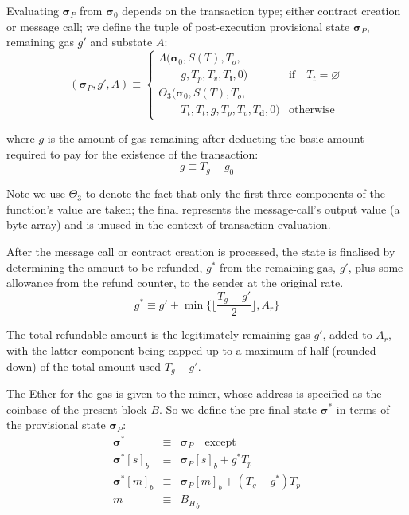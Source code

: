 \documentclass[9pt,oneside]{amsart}
\begin{document}
\begin{multicols}{2}
Evaluating $\boldsymbol{\sigma}_P$ from $\boldsymbol{\sigma}_0$ depends on the transaction type; either contract creation or message call; we define the tuple of post-execution provisional state $\boldsymbol{\sigma}_P$, remaining gas $g'$ and substate $A$:
\begin{equation}
(\boldsymbol{\sigma}_P, g', A) \equiv \begin{cases}
\Lambda(\boldsymbol{\sigma}_0, S(T), T_o, &\\ \quad\quad g, T_p, T_v, T_\mathbf{i}, 0) & \text{if} \quad T_t = \varnothing \\
\Theta_{3}(\boldsymbol{\sigma}_0, S(T), T_o, &\\ \quad\quad T_t, T_t, g, T_p, T_v, T_\mathbf{d}, 0) & \text{otherwise}
\end{cases}
\end{equation}

where $g$ is the amount of gas remaining after deducting the basic amount required to pay for the existence of the transaction:
\begin{equation}
g \equiv T_g - g_0
\end{equation}

Note we use $\Theta_{3}$ to denote the fact that only the first three components of the function's value are taken; the final represents the message-call's output value (a byte array) and is unused in the context of transaction evaluation.

After the message call or contract creation is processed, the state is finalised by determining the amount to be refunded, $g^*$ from the remaining gas, $g'$, plus some allowance from the refund counter, to the sender at the original rate.
\begin{equation}
g^* \equiv g' + \min \{ \Big\lfloor \dfrac{T_g - g'}{2} \Big\rfloor, A_r \}
\end{equation}

The total refundable amount is the legitimately remaining gas $g'$, added to $A_r$, with the latter component being capped up to a maximum of half (rounded down) of the total amount used $T_g - g'$.

The Ether for the gas is given to the miner, whose address is specified as the coinbase of the present block $B$. So we define the pre-final state $\boldsymbol{\sigma}^*$ in terms of the provisional state $\boldsymbol{\sigma}_P$:
\begin{eqnarray}
\boldsymbol{\sigma}^* & \equiv & \boldsymbol{\sigma}_P \quad \text{except} \\
\boldsymbol{\sigma}^*[s]_b & \equiv & \boldsymbol{\sigma}_P[s]_b + g^* T_p \\
\boldsymbol{\sigma}^*[m]_b & \equiv & \boldsymbol{\sigma}_P[m]_b + (T_g - g^*) T_p \\
m & \equiv & {B_H}_b
\end{eqnarray}


\end{multicols}
\end{document}
